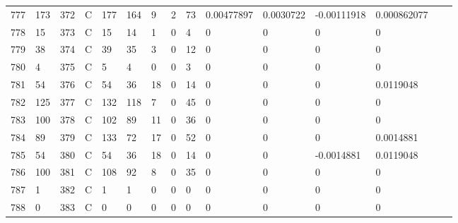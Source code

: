 \begin{longtable}{lllllllllllllll}
	777 & 173               & 372 & C   & 177               & 164               & 9                 & 2    & 73         & 0.00477897     & 0.0030722      & -0.00111918   & 0.000862077  \\
	778 & 15                & 373 & C   & 15                & 14                & 1                 & 0    & 4          & 0              & 0              & 0             & 0            \\
	779 & 38                & 374 & C   & 39                & 35                & 3                 & 0    & 12         & 0              & 0              & 0             & 0            \\
	780 & 4                 & 375 & C   & 5                 & 4                 & 0                 & 0    & 3          & 0              & 0              & 0             & 0            \\
	781 & 54                & 376 & C   & 54                & 36                & 18                & 0    & 14         & 0              & 0              & 0             & 0.0119048    \\
	782 & 125               & 377 & C   & 132               & 118               & 7                 & 0    & 45         & 0              & 0              & 0             & 0            \\
	783 & 100               & 378 & C   & 102               & 89                & 11                & 0    & 36         & 0              & 0              & 0             & 0            \\
	784 & 89                & 379 & C   & 133               & 72                & 17                & 0    & 52         & 0              & 0              & 0             & 0.0014881    \\
	785 & 54                & 380 & C   & 54                & 36                & 18                & 0    & 14         & 0              & 0              & -0.0014881    & 0.0119048    \\
	786 & 100               & 381 & C   & 108               & 92                & 8                 & 0    & 35         & 0              & 0              & 0             & 0            \\
	787 & 1                 & 382 & C   & 1                 & 1                 & 0                 & 0    & 0          & 0              & 0              & 0             & 0            \\
	788 & 0                 & 383 & C   & 0                 & 0                 & 0                 & 0    & 0          & 0              & 0              & 0             & 0            \\

\end{longtable}
